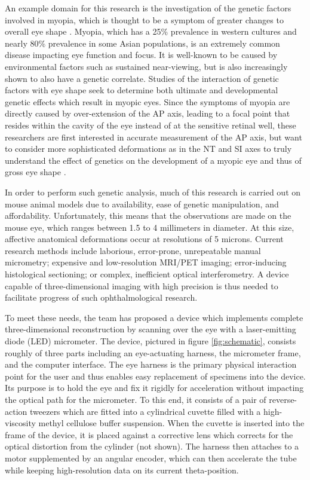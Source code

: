 \documentclass{article}
\begin{document}
An example domain for this research is the investigation of the
genetic factors involved in myopia, which is thought to be a symptom
of greater changes to overall eye shape \cite{atchison04}. Myopia,
which has a 25\% prevalence in western cultures and nearly 80\%
prevalence in some Asian populations\cite{rajan98}, is an extremely
common disease impacting eye function and focus. It is well-known to
be caused by environmental factors such as sustained near-viewing, but
is also increasingly shown to also have a genetic
correlate\cite{zhou99:genes,zhou99:models,schmucker04}. Studies of the
interaction of genetic factors with eye shape seek to determine both
ultimate and developmental genetic effects which result in myopic
eyes. Since the symptoms of myopia are directly caused by
over-extension of the AP axis, leading to a focal point that resides
within the cavity of the eye instead of at the sensitive retinal well,
these researchers are first interested in accurate measurement of the
AP axis\cite{wallman04}, but want to consider more sophisticated
deformations as in the NT and SI axes to truly understand the effect
of genetics on the development of a myopic eye\cite{schaeffel04} and
thus of gross eye shape \cite{atchison04}.
 
In order to perform such genetic analysis, much of this research is
carried out on mouse animal models due to availability, ease of
genetic manipulation, and
affordability\cite{schaeffel04}. Unfortunately, this means that the
observations are made on the mouse eye, which ranges between 1.5 to 4
millimeters in diameter. At this size, affective anatomical
deformations occur at resolutions of 5 microns. Current research
methods include laborious, error-prone, unrepeatable manual
micrometry\cite{wallman04}; expensive and low-resolution MRI/PET
imaging\cite{atchison04}; error-inducing histological
sectioning\cite{schaeffel04}; or complex, inefficient optical
interferometry\cite{guggenheim04,schaeffel04}. A device capable of
three-dimensional imaging with high precision is thus needed to
facilitate progress of such ophthalmological research.
 
To meet these needs, the team has proposed a device which implements
complete three-dimensional reconstruction by scanning over the eye
with a laser-emitting diode (LED) micrometer. The device, pictured in
figure \ref{fig:schematic}, consists roughly of three parts including
an eye-actuating harness, the micrometer frame, and the computer
interface. The eye harness is the primary physical interaction point
for the user and thus enables easy replacement of specimens into the
device. Its purpose is to hold the eye and fix it rigidly for
acceleration without impacting the optical path for the micrometer. To
this end, it consists of a pair of reverse-action tweezers which are
fitted into a cylindrical cuvette filled with a high-viscosity methyl
cellulose buffer suspension. When the cuvette is inserted into the
frame of the device, it is placed against a corrective lens which
corrects for the optical distortion from the cylinder (not shown). The
harness then attaches to a motor supplemented by an angular encoder,
which can then accelerate the tube while keeping high-resolution data
on its current theta-position.
 
\end{document}
